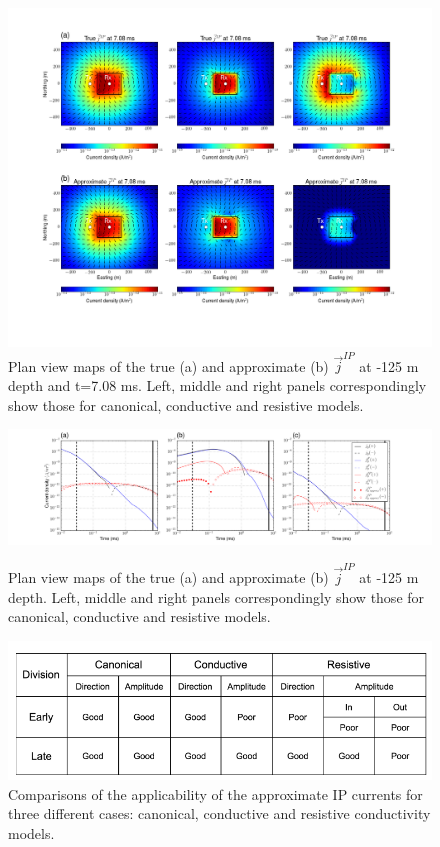 \documentclass[a4paper, 11pt]{article}
\renewcommand {\j}  { {\vec j} }
\begin{document}
\begin{figure}[htb]
  \centering  \includegraphics[width=1.0\textwidth]{figures/threecasesresp/jIPcomparison_ch38.png}
  \caption{Plan view maps of the true (a) and approximate (b) $\j^{IP}$ at -125 m depth and t=7.08 ms. Left, middle and right panels correspondingly show those for canonical, conductive and resistive models.}
  \label{F:jIPcomparison_late}
\end{figure}


\begin{figure}[htb]
  \centering  \includegraphics[width=1.0\textwidth]{figures/threecasesresp/jIPcomparison_decay.png}\\
  \caption{Plan view maps of the true (a) and approximate (b) $\j^{IP}$ at -125 m depth. Left, middle and right panels correspondingly show those for canonical, conductive and resistive models.}
  \label{F:jIPcomparison_decay}
\end{figure}

\begin{figure}[htb]
  \centering  \includegraphics[width=1.0\textwidth]{figures/threecasesresp/tableIPcurrent.png}
  \caption{Comparisons of the applicability of the approximate IP currents for three different cases: canonical, conductive and resistive conductivity models. }
  \label{F:tableIPcurrent}
\end{figure}
\end{document}
